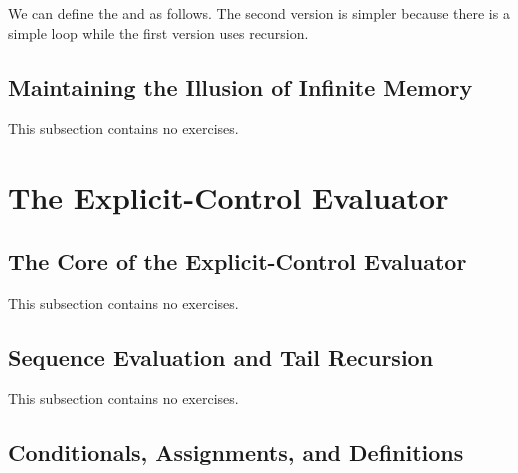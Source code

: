 \begin{exe}[5.22]
    We can define the  and  as 
    follows. The second version is simpler because there is a simple loop while 
    the first version uses recursion.
\end{exe}

\subsection{Maintaining the Illusion of Infinite Memory}

This subsection contains no exercises.

\section{The Explicit-Control Evaluator}

\subsection{The Core of the Explicit-Control Evaluator}

This subsection contains no exercises.

\subsection{Sequence Evaluation and Tail Recursion}

This subsection contains no exercises.

\subsection{Conditionals, Assignments, and Definitions}

